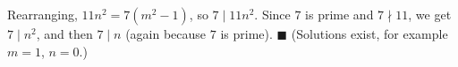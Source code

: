 Rearranging, $11n^2=7\left(m^2-1\right)$, so $7\mid11n^2$. Since $7$ is prime and $7\nmid11$, we get $7\mid n^2$, and then $7\mid n$ (again because $7$ is prime). $\blacksquare$ (Solutions exist, for example $m=1$, $n=0$.)
